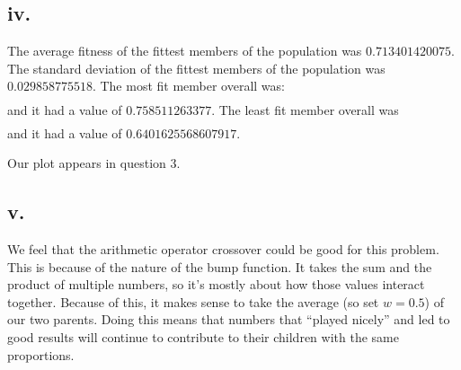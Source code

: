 \documentclass[12pt]{article}
\begin{document}
\subsection{iv.}
The average fitness of the fittest members of the population was $0.713401420075$.  The standard deviation of the fittest members of the population was $0.029858775518$.  The most fit member overall was:
\begin{align*} 
[3.064198856410788, 3.045933757913558, 3.0890092039978754, 3.073307537865654,\\ 2.858687419720218, 3.1461361256283227, 2.9391049363260886, 2.9330114316619595,\\ 2.9671806260328584, 0.4104508863181406, 0.39050790783291395, 0.49497721875386846,\\ 0.30254155872490707, 0.5434266329774524, 0.45720003735193226, 0.5109670303882086, \\ 0.46143215389831327, 0.5951647847564943, 0.3188694696960166, 0.2766059603205482]
\end{align*}
and it had a value of $0.758511263377$.  The least fit member overall was
\begin{align*}
[0.23600114763555305, 3.073816196073199, 2.9982296511970827, 3.202720680187456, \\ 2.9790205461501564, 3.022382774230237, 2.9139448909249692, 2.962096586726405, \\ 0.39667140927739053, 2.9372073655011506, 3.107027601546546, 3.026677239579595, \\ 1.3551503841351584, 0.8043543265228381, 0.4950037102453887, 0.4471412754809059, \\ 0.13667890818517237, 0.24682261227206115, 0.1630153732730799, 0.09618401485986772]
\end{align*}
and it had a value of $0.6401625568607917$.

Our plot appears in question 3.

\subsection{v.}
We feel that the arithmetic operator crossover could be good for this problem.  This is because of the nature of the bump function.  It takes the sum and the product of multiple numbers, so it's mostly about how those values interact together.  Because of this, it makes sense to take the average (so set $w=0.5$) of our two parents.  Doing this means that numbers that ``played nicely'' and led to good results will continue to contribute to their children with the same proportions.
\end{document}
